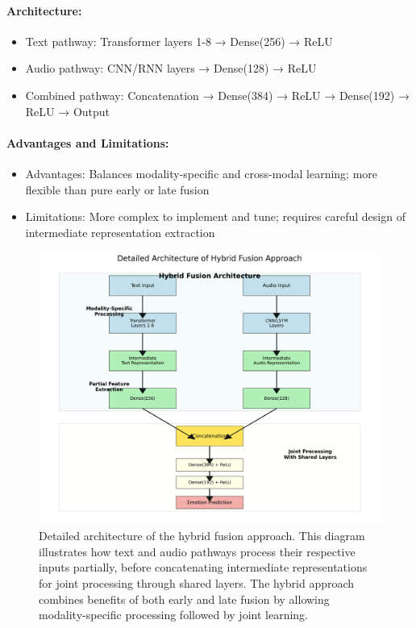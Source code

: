 \documentclass[12pt]{article}
\begin{document}
\paragraph{Architecture:}
\begin{itemize}
    \item Text pathway: Transformer layers 1-8 → Dense(256) → ReLU
    \item Audio pathway: CNN/RNN layers → Dense(128) → ReLU
    \item Combined pathway: Concatenation → Dense(384) → ReLU → Dense(192) → ReLU → Output
\end{itemize}

\paragraph{Advantages and Limitations:}
\begin{itemize}
    \item Advantages: Balances modality-specific and cross-modal learning; more flexible than pure early or late fusion
    \item Limitations: More complex to implement and tune; requires careful design of intermediate representation extraction
\end{itemize}

\begin{figure}[h]
    \centering
    \includegraphics[width=0.9\linewidth]{Figures/hybrid_fusion_detailed.png}
    \caption{Detailed architecture of the hybrid fusion approach. This diagram illustrates how text and audio pathways process their respective inputs partially, before concatenating intermediate representations for joint processing through shared layers. The hybrid approach combines benefits of both early and late fusion by allowing modality-specific processing followed by joint learning.}
    \label{fig:hybrid_fusion}
\end{figure}
\end{document}
